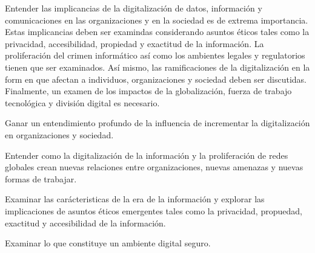 \begin{syllabus}


\begin{justification}
Entender las implicancias de la digitalización de datos, información y comunicaciones en las organizaciones y en la sociedad es de extrema importancia. Estas implicancias deben ser examindas considerando asuntos éticos tales como la privacidad, accesibilidad, propiedad y exactitud de la información. La proliferación del crimen informático así como los ambientes legales y regulatorios tienen que ser examinados. Así mismo, las ramificaciones de la digitalización en la form en que afectan a individuos, organizaciones y sociedad deben ser discutidas. Finalmente, un examen de los impactos de la globalización, fuerza de trabajo tecnológica y división digital es necesario.
\end{justification}

\begin{goals}
\item Ganar un entendimiento profundo de la influencia de incrementar la digitalización en organizaciones y sociedad.
\item Entender como la digitalización de la información y la proliferación de redes globales crean nuevas relaciones entre organizaciones, nuevas amenazas y nuevas formas de trabajar.
\item Examinar las carácteristicas de la era de la información y explorar las implicaciones de asuntos éticos emergentes tales como la privacidad, propuedad, exactitud y accesibilidad de la información.
\item Examinar lo que constituye un ambiente digital seguro.
\end{goals}

\begin{outcomes}
\end{outcomes}


\end{syllabus}
